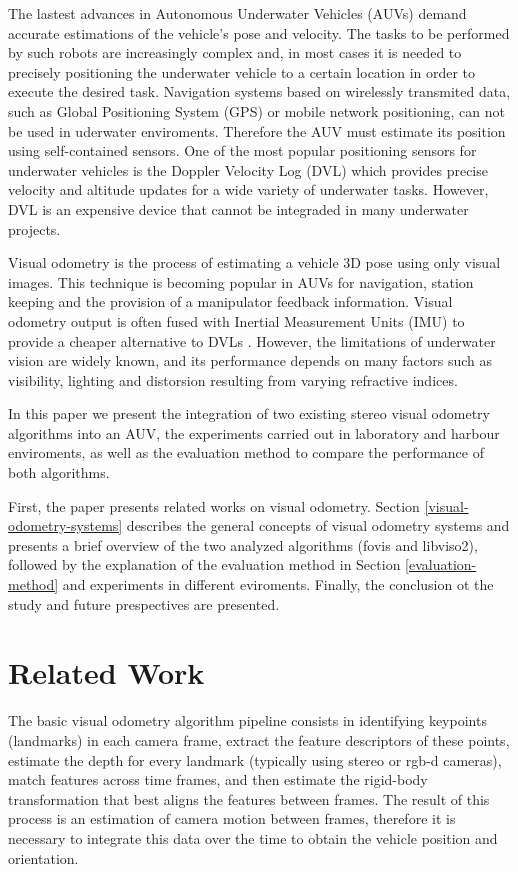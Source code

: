 \documentclass[conference]{IEEEtran}
\begin{document}
The lastest advances in Autonomous Underwater Vehicles (AUVs) demand accurate estimations of the vehicle's pose and velocity. The tasks to be performed by such robots are increasingly complex and, in most cases it is needed to precisely positioning the underwater vehicle to a certain location in order to execute the desired task. Navigation systems based on wirelessly transmited data, such as Global Positioning System (GPS) or mobile network positioning, can not be used in uderwater enviroments. Therefore the AUV must estimate its position using self-contained sensors. One of the most popular positioning sensors for underwater vehicles is the Doppler Velocity Log (DVL) which provides precise velocity and altitude updates for a wide variety of underwater tasks. However, DVL is an expensive device that cannot be integraded in many underwater projects.

Visual odometry is the process of estimating a vehicle 3D pose using only visual images. This technique is becoming popular in AUVs for navigation, station keeping and the provision of a manipulator feedback information. Visual odometry output is often fused with Inertial Measurement Units (IMU) to provide a cheaper alternative to DVLs \cite{Hildebrandt2010} \cite{Dunbabin2004}. However, the limitations of underwater vision are widely known, and its performance depends on many factors such as visibility, lighting and distorsion resulting from varying refractive indices.

In this paper we present the integration of two existing stereo visual odometry algorithms into an AUV, the experiments carried out in laboratory and harbour enviroments, as well as the evaluation method to compare the performance of both algorithms.

First, the paper presents related works on visual odometry. Section \ref{visual-odometry-systems} describes the general concepts of visual odometry systems and presents a brief overview of the two analyzed algorithms (fovis and libviso2), followed by the explanation of the evaluation method in Section \ref{evaluation-method} and experiments in different eviroments. Finally, the conclusion ot the study and future prespectives are presented.

\section{Related Work 
  \label{related-work}
}

The basic visual odometry algorithm pipeline \cite{Moravec1980} consists in identifying keypoints (landmarks) in each camera frame, extract the feature descriptors of these points, estimate the depth for every landmark (typically using stereo or rgb-d cameras), match features across time frames, and then estimate the rigid-body transformation that best aligns the features between frames. The result of this process is an estimation of  camera motion between frames, therefore it is necessary to integrate this data over the time to obtain the vehicle position and orientation.
\end{document}
